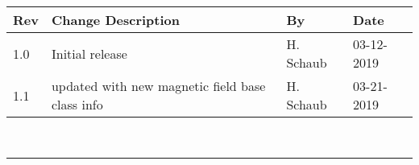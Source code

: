 \documentclass[]{BasiliskReportMemo}
\begin{document}
\makeCover

%
%
\pagestyle{empty}
{\renewcommand{\arraystretch}{2}
\noindent
\begin{longtable}{|p{0.5in}|p{3.5in}|p{1.07in}|p{0.9in}|}
\hline
{\bfseries Rev} & {\bfseries Change Description} & {\bfseries By}& {\bfseries Date} \\
\hline
1.0 & Initial release & H. Schaub & 03-12-2019\\
1.1 & updated with new magnetic field base class info & H. Schaub & 03-21-2019\\
\hline

\end{longtable}
}



\newpage
\setcounter{page}{1}
\pagestyle{fancy}

\tableofcontents %
~\\ \hrule ~\\ %










\end{document}
